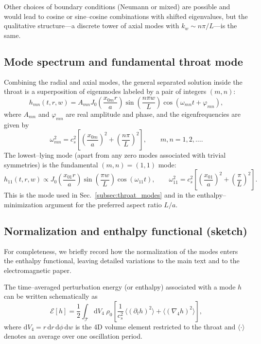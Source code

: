 \documentclass[12pt]{article}
\begin{document}
Other choices of boundary conditions (Neumann or mixed) are possible and
would lead to cosine or sine--cosine combinations with shifted eigenvalues,
but the qualitative structure---a discrete tower of axial modes with
$k_w\sim n\pi/L$---is the same.

\subsection{Mode spectrum and fundamental throat mode}

Combining the radial and axial modes, the general separated solution inside
the throat is a superposition of eigenmodes labeled by a pair of integers
$(m,n)$:
\begin{equation}
  h_{mn}(t,r,w)
  = A_{mn}
    J_0\!\left(\frac{x_{0m} r}{a}\right)
    \sin\!\left(\frac{n\pi w}{L}\right)
    \cos(\omega_{mn} t + \varphi_{mn}),
  \label{eq:app_full_mode}
\end{equation}
where $A_{mn}$ and $\varphi_{mn}$ are real amplitude and phase, and the
eigenfrequencies are given by
\begin{equation}
  \omega_{mn}^2
  = c_s^2
    \left[
      \left(\frac{x_{0m}}{a}\right)^2
      + \left(\frac{n\pi}{L}\right)^2
    \right],
  \qquad m,n=1,2,\dots.
  \label{eq:app_mode_spectrum}
\end{equation}
The lowest--lying mode (apart from any zero modes associated with trivial
symmetries) is the fundamental $(m,n)=(1,1)$ mode:
\begin{equation}
  h_{11}(t,r,w)
  \propto J_0\!\left(\frac{x_{01} r}{a}\right)
           \sin\!\left(\frac{\pi w}{L}\right)
           \cos(\omega_{11} t),
  \qquad
  \omega_{11}^2
  = c_s^2
    \left[
      \left(\frac{x_{01}}{a}\right)^2
      + \left(\frac{\pi}{L}\right)^2
    \right].
  \label{eq:app_fundamental_mode}
\end{equation}
This is the mode used in Sec.~\ref{subsec:throat_modes} and in the
enthalpy--minimization argument for the preferred aspect ratio $L/a$.

\subsection{Normalization and enthalpy functional (sketch)}

For completeness, we briefly record how the normalization of the modes
enters the enthalpy functional, leaving detailed variations to the main
text and to the electromagnetic paper.

The time--averaged perturbation energy (or enthalpy) associated with a mode
$h$ can be written schematically as
\begin{equation}
  \mathcal{E}[h]
  = \frac{1}{2}
    \int_{\mathcal{T}}\!\mathrm{d}V_4\;
      \rho_0
      \left[
        \frac{1}{c_s^2}\,\langle(\partial_t h)^2\rangle
        + \langle(\nabla_4 h)^2\rangle
      \right],
  \label{eq:app_energy_func}
\end{equation}
where $\mathrm{d}V_4 = r\,\mathrm{d}r\,\mathrm{d}\phi\,\mathrm{d}w$ is the
4D volume element restricted to the throat and $\langle\cdot\rangle$
denotes an average over one oscillation period.
\end{document}
